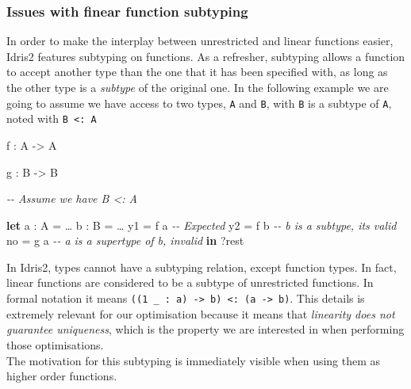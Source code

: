 \documentclass[
]{article}
\newenvironment{Shaded}{}{}
\newcommand{\CommentTok}[1]{\textcolor[rgb]{0.38,0.63,0.69}{\textit{#1}}}
\newcommand{\DataTypeTok}[1]{\textcolor[rgb]{0.56,0.13,0.00}{#1}}
\newcommand{\KeywordTok}[1]{\textcolor[rgb]{0.00,0.44,0.13}{\textbf{#1}}}
\newcommand{\NormalTok}[1]{#1}
\newcommand{\OperatorTok}[1]{\textcolor[rgb]{0.40,0.40,0.40}{#1}}
\newcommand{\OtherTok}[1]{\textcolor[rgb]{0.00,0.44,0.13}{#1}}
\begin{document}
\hypertarget{issues-with-finear-function-subtyping}{%
\subsubsection{Issues with finear function
subtyping}\label{issues-with-finear-function-subtyping}}

In order to make the interplay between unrestricted and linear functions
easier, Idris2 features subtyping on functions. As a refresher,
subtyping allows a function to accept another type than the one that it
has been specified with, as long as the other type is a \emph{subtype}
of the original one. In the following example we are going to assume we
have access to two types, \texttt{A} and \texttt{B}, with \texttt{B} is
a subtype of \texttt{A}, noted with \texttt{B\ \textless{}:\ A}

\begin{Shaded}
\begin{Highlighting}[]

\NormalTok{f }\OperatorTok{:} \DataTypeTok{A} \OtherTok{{-}\textgreater{}} \DataTypeTok{A}

\NormalTok{g }\OperatorTok{:} \DataTypeTok{B} \OtherTok{{-}\textgreater{}} \DataTypeTok{B}

\CommentTok{{-}{-} Assume we have B \textless{}: A}

\KeywordTok{let}\NormalTok{ a }\OperatorTok{:} \DataTypeTok{A} \OtherTok{=}\NormalTok{ …}
\NormalTok{    b }\OperatorTok{:} \DataTypeTok{B} \OtherTok{=}\NormalTok{ … }
\NormalTok{    y1 }\OtherTok{=}\NormalTok{ f a }\CommentTok{{-}{-} Expected}
\NormalTok{    y2 }\OtherTok{=}\NormalTok{ f b }\CommentTok{{-}{-} b is a subtype, it\textquotesingle{}s valid}
\NormalTok{    no }\OtherTok{=}\NormalTok{ g a }\CommentTok{{-}{-} a is a supertype of b, invalid}
 \KeywordTok{in} \OperatorTok{?}\NormalTok{rest}
\end{Highlighting}
\end{Shaded}

In Idris2, types cannot have a subtyping relation, except function
types. In fact, linear functions are considered to be a subtype of
unrestricted functions. In formal notation it means
\texttt{((1\ \_\ :\ a)\ -\textgreater{}\ b)\ \textless{}:\ (a\ -\textgreater{}\ b)}.
This details is extremely relevant for our optimisation because it means
that \emph{linearity does not guarantee uniqueness}, which is the
property we are interested in when performing those optimisations.\\
The motivation for this subtyping is immediately visible when using them
as higher order functions.
\end{document}
